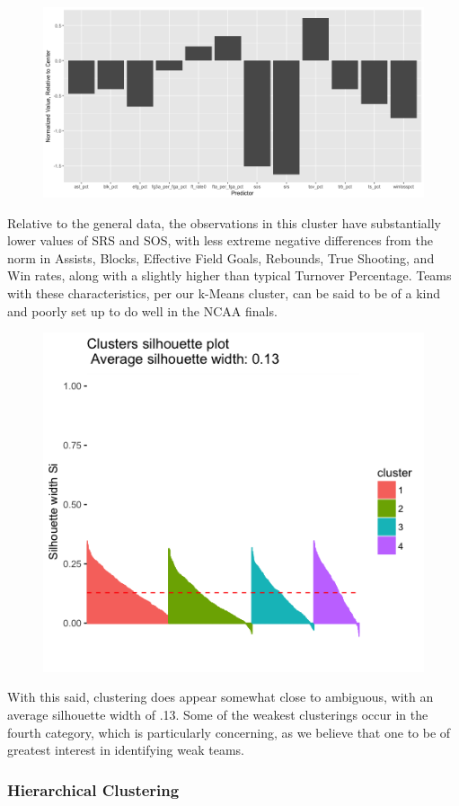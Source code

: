 \documentclass[10pt,a4paper, hidelinks]{article} %
\begin{document}
\begin{figure}[H]
	\centering
	\includegraphics[width=0.7\linewidth]{../fig/weakclusterk}
\end{figure}

Relative to the general data, the observations in this cluster have substantially lower values of SRS and SOS, with less extreme negative differences from the norm in Assists, Blocks, Effective Field Goals, Rebounds, True Shooting, and Win rates, along with a slightly higher than typical Turnover Percentage.  Teams with these characteristics, per our k-Means cluster, can be said to be of a kind and poorly set up to do well in the NCAA finals.

\begin{figure}[H]
	\centering
	\includegraphics[width=0.7\linewidth]{../fig/kmeansil}
\end{figure}

With this said, clustering does appear somewhat close to ambiguous, with an average silhouette width of .13.  Some of the weakest clusterings occur in the fourth category, which is particularly concerning, as we believe that one to be of greatest interest in identifying weak teams.

\subsubsection{Hierarchical Clustering}
\end{document}
